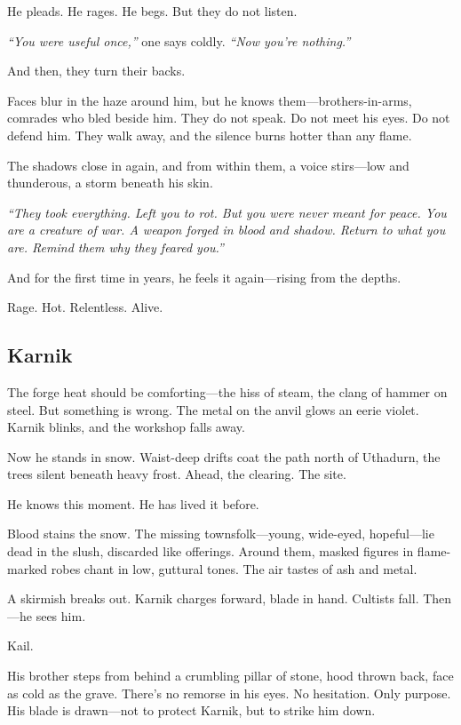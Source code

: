 \documentclass[10pt,a4paper,bg=print,twocolumn,openany,nodeprecatedcode]{dndarticle}
\begin{document}
He pleads. He rages. He begs. But they do not listen.

\textit{“You were useful once,”} one says coldly. \textit{“Now you’re nothing.”}

And then, they turn their backs.

Faces blur in the haze around him, but he knows them—brothers-in-arms, comrades who bled beside him. They do not speak. Do not meet his eyes. Do not defend him. They walk away, and the silence burns hotter than any flame.

The shadows close in again, and from within them, a voice stirs—low and thunderous, a storm beneath his skin.

\textit{“They took everything. Left you to rot. But you were never meant for peace. You are a creature of war. A weapon forged in blood and shadow. Return to what you are. Remind them why they feared you.”}

And for the first time in years, he feels it again—rising from the depths.

Rage. Hot. Relentless. Alive.

\subsection*{Karnik}

The forge heat should be comforting—the hiss of steam, the clang of hammer on steel. But something is wrong. The metal on the anvil glows an eerie violet. Karnik blinks, and the workshop falls away.

Now he stands in snow. Waist-deep drifts coat the path north of Uthadurn, the trees silent beneath heavy frost. Ahead, the clearing. The site.

He knows this moment. He has lived it before.

Blood stains the snow. The missing townsfolk—young, wide-eyed, hopeful—lie dead in the slush, discarded like offerings. Around them, masked figures in flame-marked robes chant in low, guttural tones. The air tastes of ash and metal.

A skirmish breaks out. Karnik charges forward, blade in hand. Cultists fall. Then—he sees him.

Kail.

His brother steps from behind a crumbling pillar of stone, hood thrown back, face as cold as the grave. There’s no remorse in his eyes. No hesitation. Only purpose. His blade is drawn—not to protect Karnik, but to strike him down.
\end{document}
